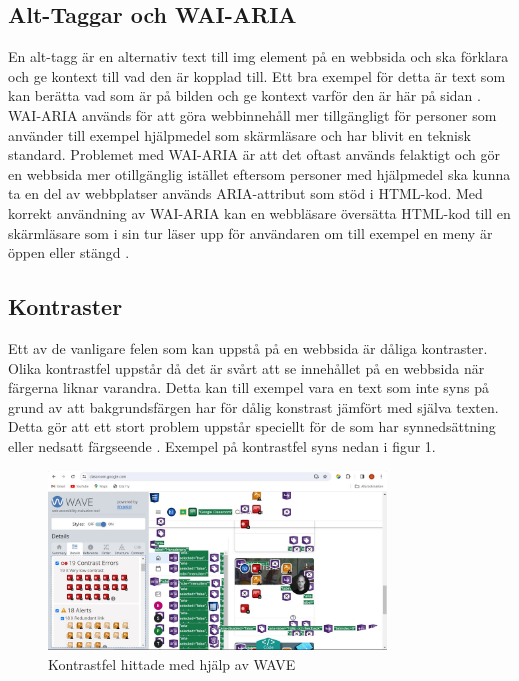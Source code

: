\documentclass[11p]{article}
\begin{document}
    \subsection{Alt-Taggar och WAI-ARIA}
    En alt-tagg är en alternativ text till img element på en webbsida och ska förklara och ge kontext till vad den är kopplad till.
    Ett bra exempel för detta är text som kan berätta vad som är på bilden och ge kontext varför den är här på sidan \textcite{Nordström}.
    WAI-ARIA används för att göra webbinnehåll mer tillgängligt för personer som använder till exempel hjälpmedel som skärmläsare och har blivit en teknisk standard. \textcite{ARIA}
    Problemet med WAI-ARIA är att det oftast används felaktigt och gör en webbsida mer otillgänglig istället eftersom personer med hjälpmedel ska kunna ta en del av webbplatser används ARIA-attribut som stöd i HTML-kod.
    Med korrekt användning av WAI-ARIA kan en webbläsare översätta HTML-kod till en skärmläsare som i sin tur läser upp för användaren om till exempel en meny är öppen eller stängd \textcite{7minds}.


    \subsection{Kontraster}
    Ett av de vanligare felen som kan uppstå på en webbsida är dåliga kontraster.
    Olika kontrastfel uppstår då det är svårt att se innehållet på en webbsida när färgerna liknar varandra.
    Detta kan till exempel vara en text som inte syns på grund av att bakgrundsfärgen har för dålig konstrast jämfört med själva texten.
    Detta gör att ett stort problem uppstår speciellt för de som har synnedsättning eller nedsatt färgseende \textcite{Digg_2021}.
    Exempel på kontrastfel syns nedan i figur 1.

    \begin{figure}[hbt!]
        \includegraphics[width=0.8\textwidth]{../images/KontrastExempel.jpg}
        \caption{ Kontrastfel hittade med hjälp av WAVE }
    \end{figure}
\end{document}
